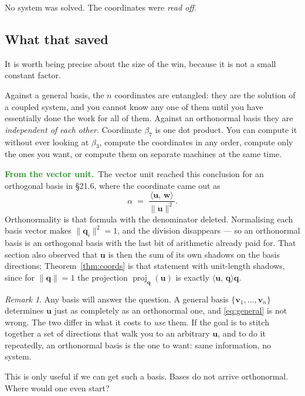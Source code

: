 \documentclass[11pt]{article}
\theoremstyle{plain}
\theoremstyle{definition}
\theoremstyle{remark}
\newtheorem*{rmk}{Remark}
\newcommand{\lookback}{\par\smallskip\noindent
  \textbf{\sffamily\textcolor{ForestGreen}{From the vector unit.}}\ \ignorespaces}
\newcommand{\vc}[1]{\mathbf{#1}}
\newcommand{\norm}[1]{\lVert #1\rVert}
\newcommand{\ip}[2]{\langle #1,\, #2\rangle}
\newcommand{\proj}[2]{\operatorname{proj}_{#1}(#2)}
\begin{document}
No system was solved. The coordinates were \emph{read off}.

\subsection{What that saved}
It is worth being precise about the size of the win, because it is not a small
constant factor.

Against a general basis, the $n$ coordinates are entangled: they are the
solution of a coupled system, and you cannot know any one of them until you have
essentially done the work for all of them. Against an orthonormal basis they are
\emph{independent of each other}. Coordinate $\beta_{7}$ is one dot product. You
can compute it without ever looking at $\beta_{3}$, compute the coordinates in
any order, compute only the ones you want, or compute them on separate machines
at the same time.

\lookback The vector unit reached this conclusion for an orthogonal basis in
\S21.6, where the coordinate came out as
\[
  \alpha \;=\; \frac{\ip{\vc{u}}{\vc{w}}}{\norm{\vc{u}}^{2}} .
\]
Orthonormality is that formula with the denominator deleted. Normalising each
basis vector makes $\norm{\vc{q}_{i}}^{2}=1$, and the division disappears --- so
an orthonormal basis is an orthogonal basis with the last bit of arithmetic
already paid for. That section also observed that $\vc{u}$ is then the sum of
its own shadows on the basis directions; Theorem~\ref{thm:coords} is that
statement with unit-length shadows, since for $\norm{\vc{q}}=1$ the projection
$\proj{\vc{q}}{\vc{u}}$ is exactly $\ip{\vc{u}}{\vc{q}}\vc{q}$.

\begin{rmk}
Any basis will answer the question. A general basis
$\{\vc{v}_{1},\dots,\vc{v}_{n}\}$ determines $\vc{u}$ just as completely as an
orthonormal one, and \eqref{eq:general} is not wrong. The two differ in what it
costs to \emph{use} them. If the goal is to stitch together a set of directions
that walk you to an arbitrary $\vc{u}$, and to do it repeatedly, an orthonormal
basis is the one to want: same information, no system.
\end{rmk}

This is only useful if we can get such a basis. Bases do not arrive orthonormal.
Where would one even start?

\end{document}
